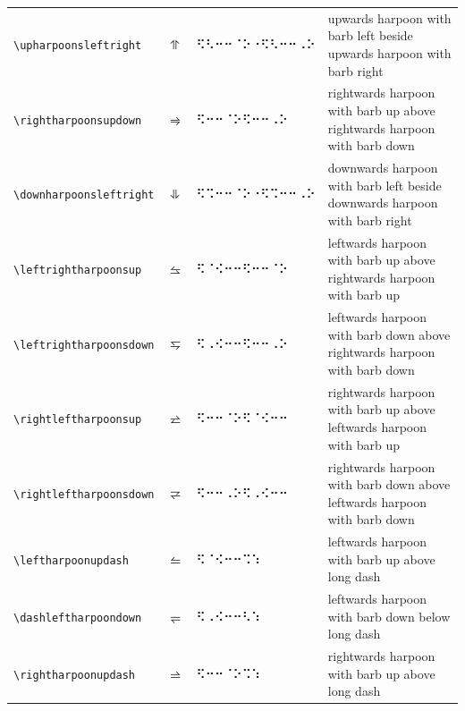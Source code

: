 \documentclass[oneside]{article}
\begin{document}
\begin{longtable}{llll}
\verb|\upharpoonsleftright| & $\upharpoonsleftright$ &   ⠫⠣⠒⠒⠈⠕⠐⠫⠣⠒⠒⠠⠕   & \begin{minipage}[t]{8cm}{upwards harpoon with barb left beside upwards harpoon with barb right}
\end{minipage}\\[4ex]
\verb|\rightharpoonsupdown| & $\rightharpoonsupdown$ &   ⠫⠒⠒⠈⠕⠫⠒⠒⠠⠕   & \begin{minipage}[t]{8cm}{rightwards harpoon with barb up above rightwards harpoon with barb down}
\end{minipage}\\[4ex]
\verb|\downharpoonsleftright| & $\downharpoonsleftright$ &   ⠫⠩⠒⠒⠈⠕⠐⠫⠩⠒⠒⠠⠕   & \begin{minipage}[t]{8cm}{downwards harpoon with barb left beside downwards harpoon with barb right}
\end{minipage}\\[4ex]
\verb|\leftrightharpoonsup| & $\leftrightharpoonsup$ &   ⠫⠈⠪⠒⠒⠫⠒⠒⠈⠕   & \begin{minipage}[t]{8cm}{leftwards harpoon with barb up above rightwards harpoon with barb up}
\end{minipage}\\[4ex]
\verb|\leftrightharpoonsdown| & $\leftrightharpoonsdown$ &   ⠫⠠⠪⠒⠒⠫⠒⠒⠠⠕   & \begin{minipage}[t]{8cm}{leftwards harpoon with barb down above rightwards harpoon with barb down}
\end{minipage}\\[4ex]
\verb|\rightleftharpoonsup| & $\rightleftharpoonsup$ &   ⠫⠒⠒⠈⠕⠫⠈⠪⠒⠒   & \begin{minipage}[t]{8cm}{rightwards harpoon with barb up above leftwards harpoon with barb up}
\end{minipage}\\[4ex]
\verb|\rightleftharpoonsdown| & $\rightleftharpoonsdown$ &   ⠫⠒⠒⠠⠕⠫⠠⠪⠒⠒   & \begin{minipage}[t]{8cm}{rightwards harpoon with barb down above leftwards harpoon with barb down}
\end{minipage}\\[4ex]
\verb|\leftharpoonupdash| & $\leftharpoonupdash$ &   ⠫⠈⠪⠒⠒⠩⠱   & {leftwards harpoon with barb up above long dash} \\[2ex]
\verb|\dashleftharpoondown| & $\dashleftharpoondown$ &   ⠫⠠⠪⠒⠒⠣⠱   & {leftwards harpoon with barb down below long dash} \\[2ex]
\verb|\rightharpoonupdash| & $\rightharpoonupdash$ &   ⠫⠒⠒⠈⠕⠩⠱   & {rightwards harpoon with barb up above long dash} \\[2ex]

\end{longtable}
\end{document}
